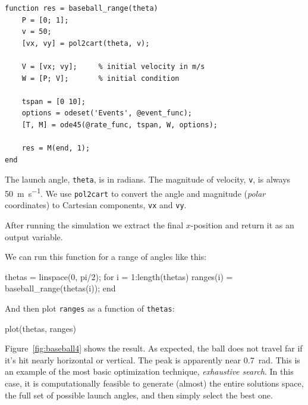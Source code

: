 
\begin{lstlisting}[caption={A function that takes the launch angle of a baseball and returns the distance it travels}, label={lst:baseball_range}]
function res = baseball_range(theta)
    P = [0; 1];
    v = 50;
    [vx, vy] = pol2cart(theta, v);

    V = [vx; vy];     % initial velocity in m/s
    W = [P; V];       % initial condition

    tspan = [0 10];
    options = odeset('Events', @event_func);
    [T, M] = ode45(@rate_func, tspan, W, options);

    res = M(end, 1);
end
\end{lstlisting}

The launch angle, \lstinline{theta}, is in radians.  The magnitude of velocity, \lstinline{v}, is always \SI{50}{\meter\per\second}.  We use \lstinline{pol2cart} to convert the angle and magnitude (\emph{polar} coordinates) to Cartesian components, \lstinline{vx} and \lstinline{vy}.


After running the simulation we extract the final $x$-position and return it as an output variable.

We can run this function for a range of angles like this:

\begin{code}
    thetas = linspace(0, pi/2);
    for i = 1:length(thetas)
        ranges(i) = baseball_range(thetas(i));
    end
\end{code}
And then plot \lstinline{ranges} as a function of \lstinline{thetas}:

\begin{code}
    plot(thetas, ranges)
\end{code}

Figure~\ref{fig:baseball4} shows the result.  As expected, the ball does not travel far if it's hit nearly horizontal or vertical.
The peak is apparently near \SI{0.7}{\radian}.  This is an example of the most basic optimization technique, \emph{exhaustive search}.  In this case, it is computationally feasible to generate (almost) the entire solutions space, the full set of possible launch angles, and then simply select the best one.  

